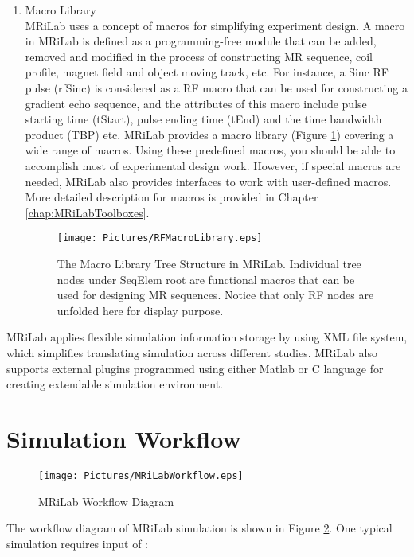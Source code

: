 \documentclass{book}%
\begin{document}
\begin{enumerate}
\item Macro Library \\
MRiLab uses a concept of macros for simplifying experiment design. A macro in MRiLab is defined as a programming-free module that can be added, removed and modified in the process of constructing MR sequence, coil profile, magnet field and object moving track, etc. For instance, a Sinc RF pulse (rfSinc) is considered as a RF macro that can be used for constructing a gradient echo sequence, and the attributes of this macro include pulse starting time (tStart), pulse ending time (tEnd) and the time bandwidth product (TBP) etc. MRiLab provides a macro library (Figure \ref{fig:RFMacroLibrary}) covering a wide range of macros. Using these predefined macros, you should be able to accomplish most of experimental design work. However, if special macros are needed, MRiLab also provides interfaces to work with user-defined macros. More detailed description for macros is provided in Chapter \ref{chap:MRiLabToolboxes}.

\begin{figure}[htbp]
	\centering
		\texttt{[image: Pictures/RFMacroLibrary.eps]}
	\caption{The Macro Library Tree Structure in MRiLab. Individual tree nodes under SeqElem root are functional macros that can be used for designing MR sequences. Notice that only RF nodes are unfolded here for display purpose.}
	\label{fig:RFMacroLibrary}
\end{figure}

\end{enumerate}
    
MRiLab applies flexible simulation information storage by using XML file system, which simplifies translating simulation across different studies. MRiLab also supports external plugins programmed using either Matlab or C language for creating extendable simulation environment. 

\section{Simulation Workflow}

\begin{figure}[htbp]
	\centering
		\texttt{[image: Pictures/MRiLabWorkflow.eps]}
	\caption{MRiLab Workflow Diagram}
	\label{fig:MRiLabWorkflow}
\end{figure}

The workflow diagram of MRiLab simulation is shown in Figure \ref{fig:MRiLabWorkflow}. One typical simulation requires input of :
\end{document}
